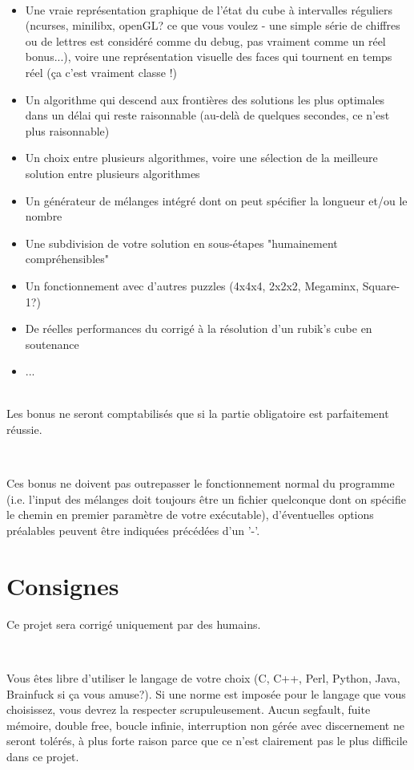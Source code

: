 \documentclass{42}
\begin{document}
\
\begin{itemize}
	\item Une vraie repr\'esentation graphique de l'\'etat du cube \`a intervalles r\'eguliers (ncurses, minilibx, openGL? ce que vous voulez - une simple s\'erie de chiffres ou de lettres est consid\'er\'e comme du debug, pas vraiment comme un r\'eel bonus...), voire une repr\'esentation visuelle des faces qui tournent en temps r\'eel (\c{c}a c'est vraiment classe !)
	\item Un algorithme qui descend aux fronti\`eres des solutions les plus optimales dans un d\'elai qui reste raisonnable (au-del\`a de quelques secondes, ce n'est plus raisonnable)
	\item Un choix entre plusieurs algorithmes, voire une s\'election de la meilleure solution entre plusieurs algorithmes
	\item Un g\'en\'erateur de m\'elanges int\'egr\'e dont on peut sp\'ecifier la longueur et/ou le nombre
	\item Une subdivision de votre solution en sous-\'etapes "humainement compr\'ehensibles"
	\item Un fonctionnement avec d'autres puzzles (4x4x4, 2x2x2, Megaminx, Square-1?)
	\item De r\'eelles performances du corrig\'e \`a la r\'esolution d'un rubik's cube en soutenance
	\item ...
\end{itemize}
\
\\
Les bonus ne seront comptabilis\'es que si la partie obligatoire est parfaitement r\'eussie.

\

Ces bonus ne doivent pas outrepasser le fonctionnement normal du programme (i.e. l'input des m\'elanges doit toujours \^etre un fichier quelconque dont on sp\'ecifie le chemin en premier param\`etre de votre ex\'ecutable), d'\'eventuelles options pr\'ealables peuvent \^etre indiqu\'ees pr\'ec\'ed\'ees d'un '-'.


%
%

\chapter{Consignes}
Ce projet sera corrig\'e uniquement par des humains.

\

Vous \^etes libre d'utiliser le langage de votre choix (C, C++, Perl, Python, Java, Brainfuck si \c{c}a vous amuse?). Si une norme est impos\'ee pour le langage que vous choisissez, vous devrez la respecter scrupuleusement. Aucun segfault, fuite m\'emoire, double free, boucle infinie, interruption non g\'er\'ee avec discernement ne seront tol\'er\'es, \`a plus forte raison parce que ce n'est clairement pas le plus difficile dans ce projet.
\end{document}
